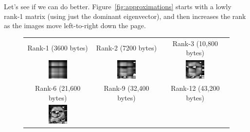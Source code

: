 \begin{alttitles}
Let's see if we can do better. Figure~\ref{fig:approximations} starts with a
lowly rank-1 matrix (using just the dominant eigenvector), and then increases
the rank as the images move left-to-right down the page.

\begin{figure}[H]
\centering
\begin{tabular}{ccc}
\scriptsize{Rank-1 (3600 bytes)} &
\scriptsize{Rank-2 (7200 bytes)} &
\scriptsize{Rank-3 (10,800 bytes)} \\
\includegraphics[width=0.3\textwidth]{approx01.png} &
\includegraphics[width=0.3\textwidth]{approx02.png} &
\includegraphics[width=0.3\textwidth]{approx03.png}\\
\smallskip
\scriptsize{Rank-6 (21,600 bytes)} &
\scriptsize{Rank-9 (32,400 bytes)} &
\scriptsize{Rank-12 (43,200 bytes)} \\
\includegraphics[width=0.3\textwidth]{approx06.png} &

\end{tabular}
\end{figure}
\end{alttitles}
